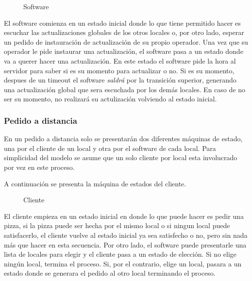 \documentclass[a4paper,10pt]{article}
\begin{document}
\begin{figure}[H]
\centering
{}
\caption{Software}
\end{figure}


El software comienza en un estado inicial donde lo que tiene permitido hacer es escuchar las actualizaciones globales de los otros locales o, por otro lado, esperar un pedido de instauraci\'on de actualizaci\'on de su propio operador. Una vez que su operador le pide instaurar una actualizaci\'on, el software pasa a un estado donde va a querer hacer una actualizaci\'on. En este estado el software pide la hora al servidor para saber si es su momento para actualizar o no. Si es su momento, despues de un timeout el software \emph{saldr\'a} por la transici\'on superior, generando una actualizaci\'on global que sera escuchada por los dem\'as locales. En caso de no ser su momento, no realizar\'a su actulizaci\'on volviendo al estado inicial.



\subsubsection*{Pedido a distancia}

En un pedido a distancia solo se presentar\'an dos diferentes m\'aquinas de estado, una por el cliente de un local y otra por el software de cada local. Para simplicidad del modelo se asume que un solo cliente por local esta involucrado por vez en este proceso.

A continuaci\'on se presenta la m\'aquina de estados del cliente.

\begin{figure}[H]
\centering
{}
\caption{Cliente}
\end{figure}

El cliente empieza en un estado inicial en donde lo que puede hacer es pedir una pizza, si la pizza puede ser hecha por el mismo local o si ningun local puede satisfacerlo, el cliente vuelve al estado inicial ya sea satisfecho o no, pero sin nada m\'as que hacer en esta secuencia. Por otro lado, el software puede presentarle una lista de locales para elegir y el cliente pasa a un estado de elecci\'on. Si no elige ning\'un local, termina el proceso. Si, por el contrario, elige un local, pasara a un estado donde se generara el pedido al otro local terminando el proceso.
\end{document}
